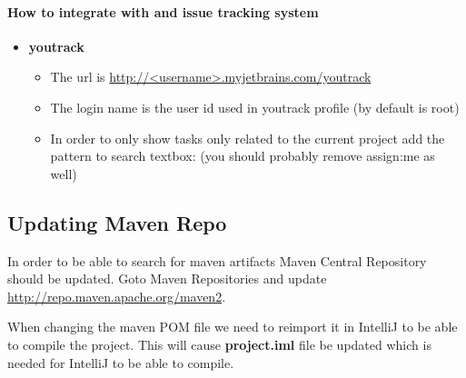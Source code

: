 \paragraph{How to integrate with and issue tracking system}

\begin{itemize}
	\item \textbf{youtrack}
	\begin{itemize}
		\item The url is \href{}{http://<username>.myjetbrains.com/youtrack}
		\item The login name is the user id used in youtrack profile (by default is root)
		\item In order to only show tasks only related to the current project add the pattern to search textbox:  (you should probably remove assign:me as well)
	\end{itemize}	
\end{itemize}

\subsection {Updating Maven Repo}
In order to be able to search for maven artifacts Maven Central Repository should be updated. Goto Maven Repositories and update \href{http://repo.maven.apache.org/maven2}{http://repo.maven.apache.org/maven2}. 

When changing the maven POM file we need to reimport it in IntelliJ to be able to compile the project. This will cause \textbf{project.iml} file be updated which is needed for IntelliJ to be able to compile.